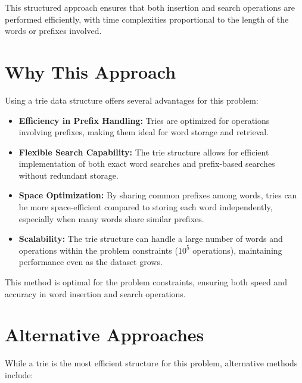 This structured approach ensures that both insertion and search operations are performed efficiently, with time complexities proportional to the length of the words or prefixes involved.

\section*{Why This Approach}

Using a trie data structure offers several advantages for this problem:

\begin{itemize}
    \item \textbf{Efficiency in Prefix Handling:}  
    Tries are optimized for operations involving prefixes, making them ideal for word storage and retrieval.
    
    \item \textbf{Flexible Search Capability:}  
    The trie structure allows for efficient implementation of both exact word searches and prefix-based searches without redundant storage.
    
    \item \textbf{Space Optimization:}  
    By sharing common prefixes among words, tries can be more space-efficient compared to storing each word independently, especially when many words share similar prefixes.
    
    \item \textbf{Scalability:}  
    The trie structure can handle a large number of words and operations within the problem constraints (\(10^5\) operations), maintaining performance even as the dataset grows.
\end{itemize}

This method is optimal for the problem constraints, ensuring both speed and accuracy in word insertion and search operations.

\section*{Alternative Approaches}

While a trie is the most efficient structure for this problem, alternative methods include:

